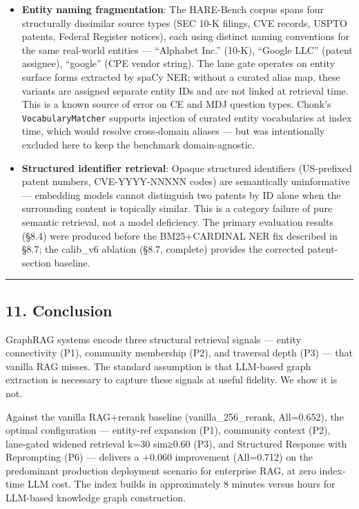 \begin{itemize}
\item
  \textbf{Entity naming fragmentation}: The HARE-Bench corpus spans four structurally dissimilar source types (SEC 10-K filings, CVE records, USPTO patents, Federal Register notices), each using distinct naming conventions for the same real-world entities --- ``Alphabet Inc.'' (10-K), ``Google LLC'' (patent assignee), ``google'' (CPE vendor string). The lane gate operates on entity surface forms extracted by spaCy NER; without a curated alias map, these variants are assigned separate entity IDs and are not linked at retrieval time. This is a known source of error on CE and MDJ question types. Chonk's \texttt{VocabularyMatcher} supports injection of curated entity vocabularies at index time, which would resolve cross-domain aliases --- but was intentionally excluded here to keep the benchmark domain-agnostic.
\item
  \textbf{Structured identifier retrieval}: Opaque structured identifiers (US-prefixed patent numbers, CVE-YYYY-NNNNN codes) are semantically uninformative --- embedding models cannot distinguish two patents by ID alone when the surrounding content is topically similar. This is a category failure of pure semantic retrieval, not a model deficiency. The primary evaluation results (§8.4) were produced before the BM25+CARDINAL NER fix described in §8.7; the calib\_v6 ablation (§8.7, complete) provides the corrected patent-section baseline.
\end{itemize}

\begin{center}\rule{0.5\linewidth}{0.5pt}\end{center}

\subsection{11. Conclusion}\label{conclusion}

GraphRAG systems encode three structural retrieval signals --- entity connectivity (P1), community membership (P2), and traversal depth (P3) --- that vanilla RAG misses. The standard assumption is that LLM-based graph extraction is necessary to capture these signals at useful fidelity. We show it is not.

Against the vanilla RAG+rerank baseline (vanilla\_256\_rerank, All=0.652), the optimal configuration --- entity-ref expansion (P1), community context (P2), lane-gated widened retrieval k=30 sim≥0.60 (P3), and Structured Response with Reprompting (P6) --- delivers a +0.060 improvement (All=0.712) on the predominant production deployment scenario for enterprise RAG, at zero index-time LLM cost. The index builds in approximately 8 minutes versus hours for LLM-based knowledge graph construction.

